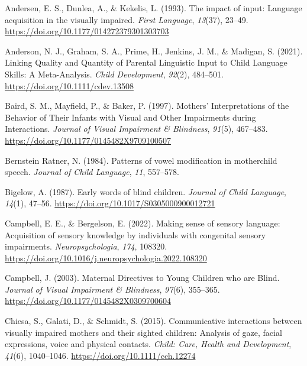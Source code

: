\documentclass[
  man,floatsintext]{apa6}
\newlength{\cslhangindent}
\newlength{\cslentryspacingunit} %
\newenvironment{CSLReferences}[2] %
 {%
  \setlength{\parindent}{0pt}
  \ifodd #1
  \let\oldpar\par
  \def\par{\hangindent=\cslhangindent\oldpar}
  \fi
  \setlength{\parskip}{#2\cslentryspacingunit}
 }%
 {}
\begin{document}
\hypertarget{refs}{}
\begin{CSLReferences}{1}{0}
\leavevmode{}%
Andersen, E. S., Dunlea, A., \& Kekelis, L. (1993). The impact of input: Language acquisition in the visually impaired. \emph{First Language}, \emph{13}(37), 23--49. \url{https://doi.org/10.1177/014272379301303703}

\leavevmode{}%
Anderson, N. J., Graham, S. A., Prime, H., Jenkins, J. M., \& Madigan, S. (2021). Linking {Quality} and {Quantity} of {Parental Linguistic Input} to {Child Language Skills}: {A Meta-Analysis}. \emph{Child Development}, \emph{92}(2), 484--501. \url{https://doi.org/10.1111/cdev.13508}

\leavevmode{}%
Baird, S. M., Mayfield, P., \& Baker, P. (1997). Mothers' {Interpretations} of the {Behavior} of {Their Infants} with {Visual} and {Other Impairments} during {Interactions}. \emph{Journal of Visual Impairment \& Blindness}, \emph{91}(5), 467--483. \url{https://doi.org/10.1177/0145482X9709100507}

\leavevmode{}%
Bernstein Ratner, N. (1984). Patterns of vowel modification in mother\textendash child speech. \emph{Journal of Child Language}, \emph{11}, 557--578.

\leavevmode{}%
Bigelow, A. (1987). Early words of blind children. \emph{Journal of Child Language}, \emph{14}(1), 47--56. \url{https://doi.org/10.1017/S0305000900012721}

\leavevmode{}%
Campbell, E. E., \& Bergelson, E. (2022). Making sense of sensory language: {Acquisition} of sensory knowledge by individuals with congenital sensory impairments. \emph{Neuropsychologia}, \emph{174}, 108320. \url{https://doi.org/10.1016/j.neuropsychologia.2022.108320}

\leavevmode{}%
Campbell, J. (2003). Maternal {Directives} to {Young Children} who are {Blind}. \emph{Journal of Visual Impairment \& Blindness}, \emph{97}(6), 355--365. \url{https://doi.org/10.1177/0145482X0309700604}

\leavevmode{}%
Chiesa, S., Galati, D., \& Schmidt, S. (2015). Communicative interactions between visually impaired mothers and their sighted children: Analysis of gaze, facial expressions, voice and physical contacts. \emph{Child: Care, Health and Development}, \emph{41}(6), 1040--1046. \url{https://doi.org/10.1111/cch.12274}


\end{CSLReferences}
\end{document}
